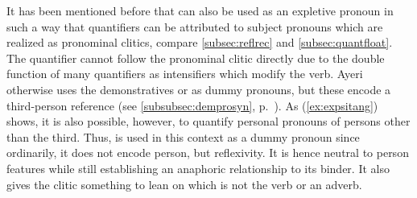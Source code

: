 It has been mentioned before that  can also be used
as an expletive pronoun in such a way that quantifiers can be attributed to
subject pronouns which are realized as pronominal clitics, compare 
\autoref{subsec:reflrec} and \autoref{subsec:quantfloat}. The quantifier cannot
follow the pronominal clitic directly due to the double function of many
quantifiers as intensifiers which modify the verb. Ayeri otherwise uses the
demonstratives  or 
as dummy pronouns, but these encode a third-person reference (see
\autoref{subsubsec:demprosyn}, p.~\pageref{subsubsec:demprosyn}). As 
(\ref{ex:expsitang}) shows, it is also possible, however, to quantify personal
pronouns of persons other than the third. Thus,  is used in
this context as a dummy pronoun since ordinarily, it does not encode person,
but reflexivity. It is hence neutral to person features while still
establishing an anaphoric relationship to its binder. It also gives the clitic
something to lean on which is not the verb or an adverb.

